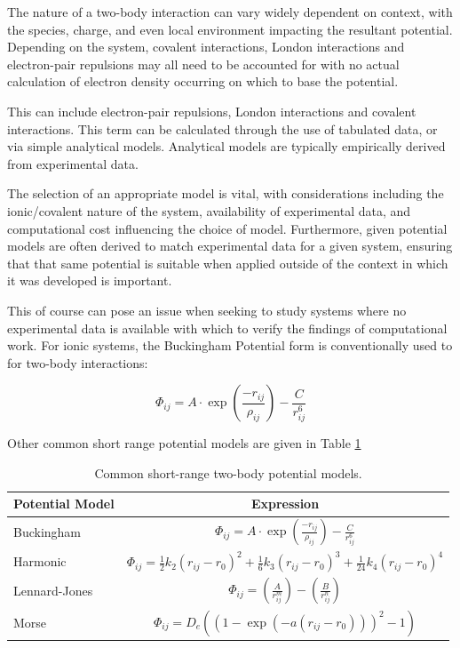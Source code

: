 The nature of a two-body interaction can vary widely dependent on context, with the species, charge, and even local environment impacting the resultant potential.
Depending on the system, covalent interactions, London interactions and electron-pair repulsions may all need to be accounted for with no actual calculation of electron density occurring on which to base the potential.

This can include electron-pair repulsions, London interactions and covalent interactions.
This term can be calculated through the use of tabulated data, or via simple analytical models.
Analytical models are typically empirically derived from experimental data.

The selection of an appropriate model is vital, with considerations including the ionic/covalent nature of the system, availability of experimental data, and computational cost influencing the choice of model.
Furthermore, given potential models are often derived to match experimental data for a given system, ensuring that that same potential is suitable when applied outside of the context in which it was developed is important.

This of course can pose an issue when seeking to study systems where no experimental data is available with which to verify the findings of computational work.
 For ionic systems, the Buckingham Potential form is conventionally used to for two-body interactions:


\begin{equation}
\Phi_{ij} = A\cdot \exp \left(\frac{-r_{ij}}{\rho_{ij}} \right) - \frac{C}{r_{ij}^6}
\label{eq:Buckingham}
\end{equation}

\noindent Other common short range potential models are given in Table \ref{tab:potentialmodels}

\begin{table}[t]
  \centering
  \caption{Common short-range two-body potential models.\cite{Gale2003}}
  \label{tab:potentialmodels}
  \begin{tabular}{@{}lc@{}}
  \toprule
  Potential Model         & Expression     \\
  \midrule
  Buckingham              & $\displaystyle{\Phi_{ij} = A\cdot \exp \left(\frac{-r_{ij}}{\rho_{ij}} \right) - \frac{C}{r_{ij}^6}}$    \\
  \addlinespace
  Harmonic                & $\displaystyle{\Phi_{ij} = \frac{1}{2}k_2(r_{ij}-r_0)^2   + \frac{1}{6}k_3(r_{ij}-r_0)^3    + \frac{1}{24}k_4(r_{ij}-r_0)^4   }$    \\
  \addlinespace
  Lennard-Jones           & $\displaystyle{\Phi_{ij} = \left(\frac{A}{r_{ij}^m} \right) - \left( \frac{B}{r_{ij}^n}\right)}$   \\
  \addlinespace
  Morse                   & $\displaystyle{\Phi_{ij} = D_e \left((1- \exp(-a(r_{ij} - r_0)))^2           -1\right) }$    \\
  \bottomrule
  \end{tabular}
\end{table}

